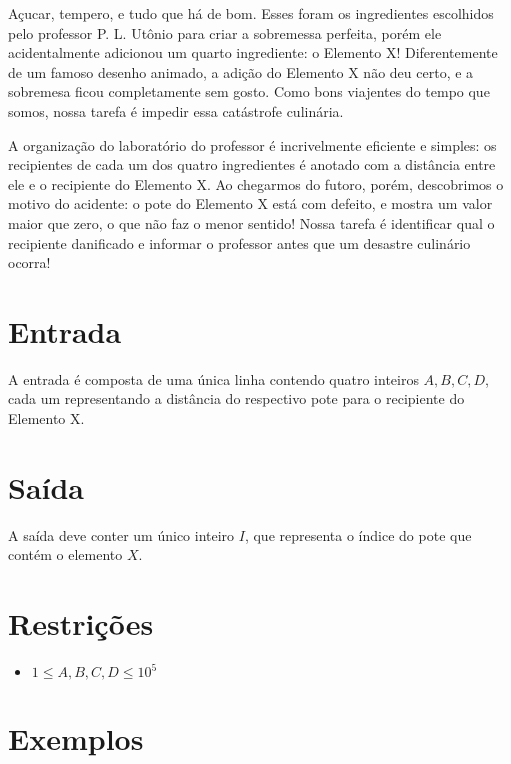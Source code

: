 Açucar, tempero, e tudo que há de bom. Esses foram os ingredientes escolhidos pelo professor P. L. Utônio para criar a sobremessa perfeita,
porém ele acidentalmente adicionou um quarto ingrediente: o Elemento X! Diferentemente de um famoso desenho animado, a adição do Elemento X não deu certo,
e a sobremesa ficou completamente sem gosto. Como bons viajentes do tempo que somos, nossa tarefa é impedir essa catástrofe culinária.

A organização do laboratório do professor é incrivelmente eficiente e simples: os recipientes de cada um dos quatro ingredientes
é anotado com a distância entre ele e o recipiente do Elemento X. Ao chegarmos do futoro, porém, descobrimos o motivo do acidente:
o pote do Elemento X está com defeito, e mostra um valor maior que zero, o que não faz o menor sentido!
Nossa tarefa é identificar qual o recipiente danificado e informar o professor antes que um desastre culinário ocorra!

\section*{Entrada}

A entrada é composta de uma única linha contendo quatro inteiros $A, B, C, D$, cada um representando a distância do respectivo pote
para o recipiente do Elemento X.

\section*{Saída}

A saída deve conter um único inteiro $I$, que representa o índice do pote que contém o elemento $X$.

\section*{Restrições}

\begin{itemize}
\item $ 1 \leq A, B, C, D \leq 10^5$
\end{itemize}


\section*{Exemplos}

\exemplo
